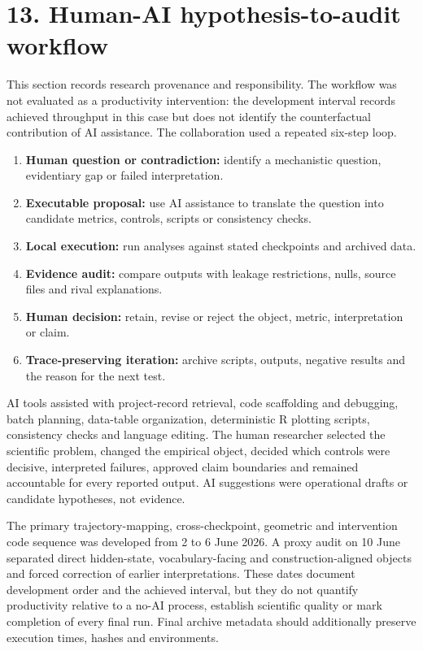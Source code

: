 \documentclass[10pt]{article}
\begin{document}
\section*{13. Human-AI hypothesis-to-audit workflow}

This section records research provenance and responsibility. The workflow was not evaluated as a productivity intervention: the development interval records achieved throughput in this case but does not identify the counterfactual contribution of AI assistance. The collaboration used a repeated six-step loop.

\begin{enumerate}[leftmargin=1.6em,itemsep=0.2em,topsep=0.2em]

\item \textbf{Human question or contradiction:} identify a mechanistic question, evidentiary gap or failed interpretation.

\item \textbf{Executable proposal:} use AI assistance to translate the question into candidate metrics, controls, scripts or consistency checks.

\item \textbf{Local execution:} run analyses against stated checkpoints and archived data.

\item \textbf{Evidence audit:} compare outputs with leakage restrictions, nulls, source files and rival explanations.

\item \textbf{Human decision:} retain, revise or reject the object, metric, interpretation or claim.

\item \textbf{Trace-preserving iteration:} archive scripts, outputs, negative results and the reason for the next test.

\end{enumerate}

AI tools assisted with project-record retrieval, code scaffolding and debugging, batch planning, data-table organization, deterministic R plotting scripts, consistency checks and language editing. The human researcher selected the scientific problem, changed the empirical object, decided which controls were decisive, interpreted failures, approved claim boundaries and remained accountable for every reported output. AI suggestions were operational drafts or candidate hypotheses, not evidence.

The primary trajectory-mapping, cross-checkpoint, geometric and intervention code sequence was developed from 2 to 6 June 2026. A proxy audit on 10 June separated direct hidden-state, vocabulary-facing and construction-aligned objects and forced correction of earlier interpretations. These dates document development order and the achieved interval, but they do not quantify productivity relative to a no-AI process, establish scientific quality or mark completion of every final run. Final archive metadata should additionally preserve execution times, hashes and environments.
\end{document}
